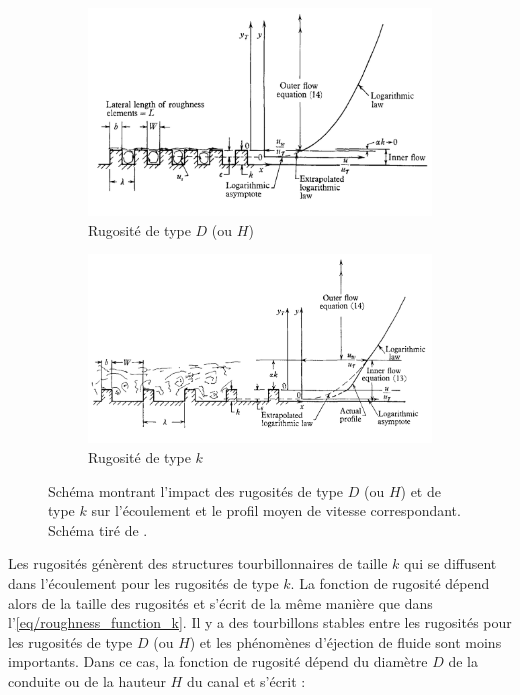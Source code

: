 \begin{figure}[!hbtp]
    \centering
    \captionsetup[subfigure]{justification=centering}
    \begin{subfigure}[b]{\textwidth}
      \includegraphics[width=\linewidth]{Chap1/Pictures/Ecoulement_rugueux/d_type_roughness_Perry.png}
      \caption{Rugosité de type $D$ (ou $H$)}
    \end{subfigure}%
    \hspace{1em}
    \begin{subfigure}[b]{\textwidth}
      \includegraphics[width=\linewidth]{Chap1/Pictures/Ecoulement_rugueux/k_type_roughness_Perry.png}
      \caption{Rugosité de type $k$}
    \end{subfigure}
    \caption{Schéma montrant l'impact des rugosités de type $D$ (ou $H$) et de type $k$ sur l'écoulement et le profil moyen de vitesse correspondant. Schéma tiré de \cite{Perry1969}.}
    \label{fig/roughness_type}
\end{figure}

\clearpage
Les rugosités génèrent des structures tourbillonnaires de taille $k$ qui se diffusent dans l'écoulement pour les rugosités de type $k$. La fonction de rugosité dépend alors de la taille des rugosités et s'écrit de la même manière que dans l'\cref{eq/roughness_function_k}. Il y a des tourbillons stables entre les rugosités pour les rugosités de type $D$ (ou $H$) et les phénomènes d'éjection de fluide sont moins importants. Dans ce cas, la fonction de rugosité dépend du diamètre $D$ de la conduite ou de la hauteur $H$ du canal et s'écrit :

